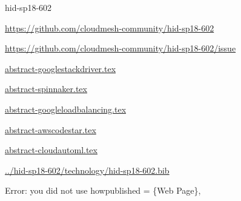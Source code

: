 \begin{IU}

hid-sp18-602

\url{https://github.com/cloudmesh-community/hid-sp18-602}

\url{https://github.com/cloudmesh-community/hid-sp18-602/issue}

\href{https://github.com/cloudmesh-community/hid-sp18-602/blob/master//technology/abstract-googlestackdriver.tex}{abstract-googlestackdriver.tex}

\href{https://github.com/cloudmesh-community/hid-sp18-602/blob/master//technology/abstract-spinnaker.tex}{abstract-spinnaker.tex}

\href{https://github.com/cloudmesh-community/hid-sp18-602/blob/master//technology/abstract-googleloadbalancing.tex}{abstract-googleloadbalancing.tex}

\href{https://github.com/cloudmesh-community/hid-sp18-602/blob/master//technology/abstract-awscodestar.tex}{abstract-awscodestar.tex}

\href{https://github.com/cloudmesh-community/hid-sp18-602/blob/master//technology/abstract-cloudautoml.tex}{abstract-cloudautoml.tex}

\href{https://github.com/cloudmesh-community/hid-sp18-602/blob/master//technology/hid-sp18-602.bib}{../hid-sp18-602/technology/hid-sp18-602.bib}

Error: you did not use howpublished = \{Web Page\},

\end{IU}
